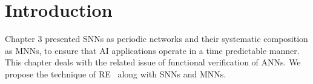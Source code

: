 \section{Introduction}
\label{sec:intro2}

Chapter 3 presented \acfp{SNN} as periodic networks and their systematic composition as \acfp{MNN}, to ensure that \ac{AI} applications operate in a time predictable manner.
This chapter deals with the related issue of functional verification of \acp{ANN}.
We propose the technique of \acf{RE}~\cite{recps} along with \acp{SNN} and \acp{MNN}.
